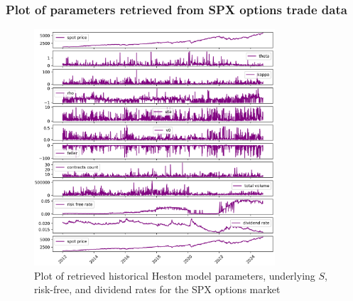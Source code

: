 \documentclass[11pt]{article}
\begin{document}
		\subsubsection{Plot of parameters retrieved from SPX options trade data}
			\begin{figure}[h]
				\centering
				\includegraphics[width=0.8\textwidth]{calibrations.png}
				\caption{Plot of retrieved historical Heston \cite{heston_1993_a} model parameters, underlying $S$, risk-free, and dividend rates for the SPX options market}
				\label{fig:calibrations}
			\end{figure}
			\newpage
	
\end{document}
